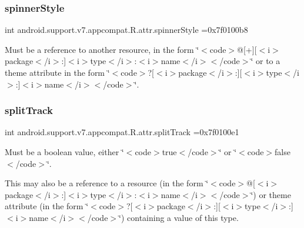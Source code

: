 \subsubsection{\texorpdfstring{spinner\+Style}{spinnerStyle}}
{\footnotesize\ttfamily int android.\+support.\+v7.\+appcompat.\+R.\+attr.\+spinner\+Style =0x7f0100b8\hspace{0.3cm}{\ttfamily [static]}}

Must be a reference to another resource, in the form \char`\"{}$<$code$>$@\mbox{[}+\mbox{]}\mbox{[}$<$i$>$package$<$/i$>$\+:\mbox{]}$<$i$>$type$<$/i$>$\+:$<$i$>$name$<$/i$>$$<$/code$>$\char`\"{} or to a theme attribute in the form \char`\"{}$<$code$>$?\mbox{[}$<$i$>$package$<$/i$>$\+:\mbox{]}\mbox{[}$<$i$>$type$<$/i$>$\+:\mbox{]}$<$i$>$name$<$/i$>$$<$/code$>$\char`\"{}. \mbox{\label{classandroid_1_1support_1_1v7_1_1appcompat_1_1R_1_1attr_a08513fcb56feb3b7b1bd74cf05b29675}} 
\subsubsection{\texorpdfstring{split\+Track}{splitTrack}}
{\footnotesize\ttfamily int android.\+support.\+v7.\+appcompat.\+R.\+attr.\+split\+Track =0x7f0100e1\hspace{0.3cm}{\ttfamily [static]}}

Must be a boolean value, either \char`\"{}$<$code$>$true$<$/code$>$\char`\"{} or \char`\"{}$<$code$>$false$<$/code$>$\char`\"{}. 

This may also be a reference to a resource (in the form \char`\"{}$<$code$>$@\mbox{[}$<$i$>$package$<$/i$>$\+:\mbox{]}$<$i$>$type$<$/i$>$\+:$<$i$>$name$<$/i$>$$<$/code$>$\char`\"{}) or theme attribute (in the form \char`\"{}$<$code$>$?\mbox{[}$<$i$>$package$<$/i$>$\+:\mbox{]}\mbox{[}$<$i$>$type$<$/i$>$\+:\mbox{]}$<$i$>$name$<$/i$>$$<$/code$>$\char`\"{}) containing a value of this type. \mbox{\label{classandroid_1_1support_1_1v7_1_1appcompat_1_1R_1_1attr_a105b975d386211520bb1ee265d48b7b8}} 
